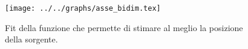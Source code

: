 \begin{figure}[h] \centering\texttt{[image: ../../graphs/asse\_bidim.tex]}\caption{Fit della funzione che permette di stimare al meglio la posizione della sorgente. }\label{gr:asse_bidim} \end{figure}

